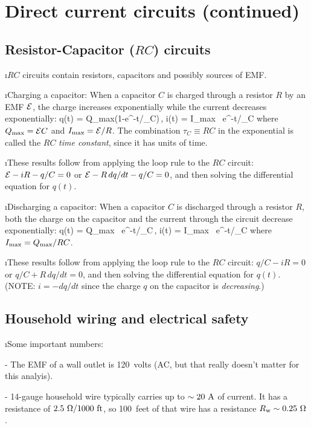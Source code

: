 \section{Direct current circuits (continued)}

\subsection{Resistor-Capacitor ($RC$) circuits}

\bi
\i $RC$ circuits contain resistors, capacitors and possibly
sources of EMF.

\i Charging a capacitor:
When a capacitor $C$ is charged through a resistor $R$ 
by an EMF ${\cal E}$, the charge increases exponentially
while the current decreases exponentially:
%
\be
q(t) = Q_{\rm max}\left(1-e^{-t/\tau_C}\right)\,,
\qquad
i(t) = I_{\rm max} \, e^{-t/\tau_C}
\ee
%
where 
$Q_{\rm max} = {\cal E}C$ and
$I_{\rm max} = {\cal E}/R$.
The combination $\tau_C\equiv RC$ in the 
exponential is called the $RC$ 
{\em time constant}, since it has units of time.

\i These results follow from applying the loop 
rule to the $RC$ circuit:
${\cal E} - i R- {q}/{C} =0$ or
${\cal E} - R\,{dq}/{dt}- {q}/{C} =0$,
and then solving the differential equation
for $q(t)$.

\i Discharging a capacitor:
When a capacitor $C$ is discharged through a resistor
$R$, both the charge on the capacitor and the current
through the circuit decrease exponentially:
%
\be
q(t) = Q_{\rm max} \, e^{-t/\tau_C}\,,
\qquad
i(t) = I_{\rm max} \, e^{-t/\tau_C}
\ee
%
where $I_{\rm max} = Q_{\rm max}/RC$.

\i These results follow from applying the loop 
rule to the $RC$ circuit:
${q}/{C} -i R=0$ or
${q}/{C} + R\,{dq}/{dt} =0$,
and then solving the differential equation
for $q(t)$.
(NOTE: $i = -dq/dt$ since the charge $q$ on the capacitor
is {\em decreasing}.)

\ei

\subsection{Household wiring and electrical safety}

\bi
\i Some important numbers:

- The EMF of a wall outlet is 120~volts (AC, but that really
doesn't matter for this analyis).

- 14-gauge household wire typically carries up to $\sim 20~{\rm A}$ 
of current.
It has a resistance of $2.5~\Omega/1000~{\rm ft}$, 
so 100~feet of that wire has a resistance 
$R_{\rm w} \sim 0.25~\Omega$.

